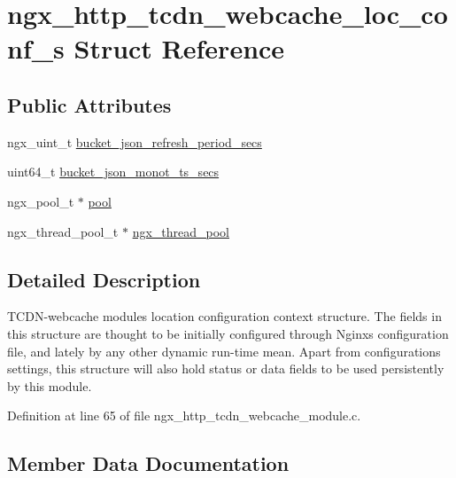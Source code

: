 \hypertarget{structngx__http__tcdn__webcache__loc__conf__s}{}\section{ngx\+\_\+http\+\_\+tcdn\+\_\+webcache\+\_\+loc\+\_\+conf\+\_\+s Struct Reference}
\label{structngx__http__tcdn__webcache__loc__conf__s}
\subsection*{Public Attributes}
\begin{DoxyCompactItemize}
\item 
ngx\+\_\+uint\+\_\+t \hyperlink{structngx__http__tcdn__webcache__loc__conf__s_a9730c60ca294166a96154e7ada19a3ec}{bucket\+\_\+json\+\_\+refresh\+\_\+period\+\_\+secs}
\item 
uint64\+\_\+t \hyperlink{structngx__http__tcdn__webcache__loc__conf__s_a3ea999ac7a3d6d325d3101658677706c}{bucket\+\_\+json\+\_\+monot\+\_\+ts\+\_\+secs}
\item 
ngx\+\_\+pool\+\_\+t $\ast$ \hyperlink{structngx__http__tcdn__webcache__loc__conf__s_a94064da09d7e03102f9906f20b139e6e}{pool}
\item 
ngx\+\_\+thread\+\_\+pool\+\_\+t $\ast$ \hyperlink{structngx__http__tcdn__webcache__loc__conf__s_a45fb29b1a518f86433416c1798d6bef9}{ngx\+\_\+thread\+\_\+pool}
\end{DoxyCompactItemize}


\subsection{Detailed Description}
T\+C\+D\+N-\/webcache module\textquotesingle{}s location configuration context structure. The fields in this structure are thought to be initially configured through Nginx\textquotesingle{}s configuration file, and lately by any other dynamic run-\/time mean. Apart from configurations settings, this structure will also hold status or data fields to be used persistently by this module. 

Definition at line 65 of file ngx\+\_\+http\+\_\+tcdn\+\_\+webcache\+\_\+module.\+c.



\subsection{Member Data Documentation}
